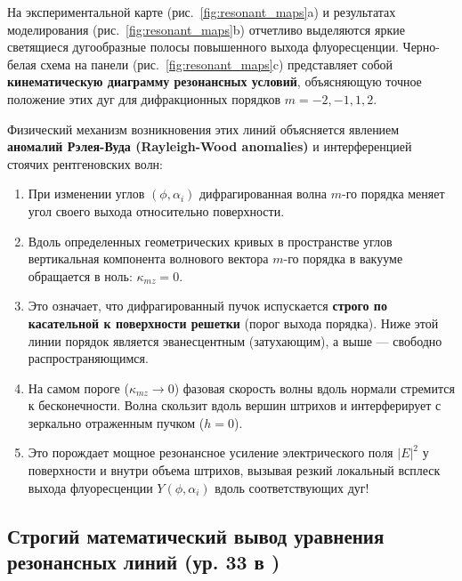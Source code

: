 \documentclass[a4paper,11pt]{article}
\begin{document}
На экспериментальной карте (рис.~\ref{fig:resonant_maps}a) и результатах моделирования (рис.~\ref{fig:resonant_maps}b) отчетливо выделяются яркие светящиеся дугообразные полосы повышенного выхода флуоресценции. Черно-белая схема на панели (рис.~\ref{fig:resonant_maps}c) представляет собой \textbf{кинематическую диаграмму резонансных условий}, объясняющую точное положение этих дуг для дифракционных порядков $m = -2, -1, 1, 2$.

Физический механизм возникновения этих линий объясняется явлением \textbf{аномалий Рэлея-Вуда (Rayleigh-Wood anomalies)} и интерференцией стоячих рентгеновских волн:
\begin{enumerate}
    \item При изменении углов $(\phi, \alpha_i)$ дифрагированная волна $m$-го порядка меняет угол своего выхода относительно поверхности.
    \item Вдоль определенных геометрических кривых в пространстве углов вертикальная компонента волнового вектора $m$-го порядка в вакууме обращается в ноль: $\kappa_{mz} = 0$.
    \item Это означает, что дифрагированный пучок испускается \textbf{строго по касательной к поверхности решетки} (порог выхода порядка). Ниже этой линии порядок является эванесцентным (затухающим), а выше — свободно распространяющимся.
    \item На самом пороге ($\kappa_{mz} \to 0$) фазовая скорость волны вдоль нормали стремится к бесконечности. Волна скользит вдоль вершин штрихов и интерферирует с зеркально отраженным пучком ($h = 0$).
    \item Это порождает мощное резонансное усиление электрического поля $|E|^2$ у поверхности и внутри объема штрихов, вызывая резкий локальный всплеск выхода флуоресценции $Y(\phi, \alpha_i)$ вдоль соответствующих дуг!
\end{enumerate}

\subsection{Строгий математический вывод уравнения резонансных линий (ур. 33 в \cite{nikolaev2020})}
\end{document}
